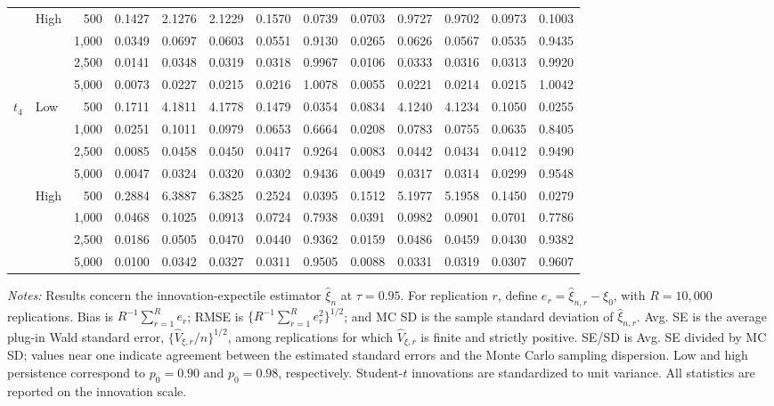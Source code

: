 \begin{table}[!p]
\begin{tabular}{llr*{10}{r}}
\addlinespace[1pt]
 & High & 500 & 0.1427 & 2.1276 & 2.1229 & 0.1570 & 0.0739 & 0.0703 & 0.9727 & 0.9702 & 0.0973 & 0.1003\\
 &  & 1,000 & 0.0349 & 0.0697 & 0.0603 & 0.0551 & 0.9130 & 0.0265 & 0.0626 & 0.0567 & 0.0535 & 0.9435\\
 &  & 2,500 & 0.0141 & 0.0348 & 0.0319 & 0.0318 & 0.9967 & 0.0106 & 0.0333 & 0.0316 & 0.0313 & 0.9920\\
 &  & 5,000 & 0.0073 & 0.0227 & 0.0215 & 0.0216 & 1.0078 & 0.0055 & 0.0221 & 0.0214 & 0.0215 & 1.0042\\
\addlinespace[3pt]
$t_4$ & Low & 500 & 0.1711 & 4.1811 & 4.1778 & 0.1479 & 0.0354 & 0.0834 & 4.1240 & 4.1234 & 0.1050 & 0.0255\\
 &  & 1,000 & 0.0251 & 0.1011 & 0.0979 & 0.0653 & 0.6664 & 0.0208 & 0.0783 & 0.0755 & 0.0635 & 0.8405\\
 &  & 2,500 & 0.0085 & 0.0458 & 0.0450 & 0.0417 & 0.9264 & 0.0083 & 0.0442 & 0.0434 & 0.0412 & 0.9490\\
 &  & 5,000 & 0.0047 & 0.0324 & 0.0320 & 0.0302 & 0.9436 & 0.0049 & 0.0317 & 0.0314 & 0.0299 & 0.9548\\
\addlinespace[1pt]
 & High & 500 & 0.2884 & 6.3887 & 6.3825 & 0.2524 & 0.0395 & 0.1512 & 5.1977 & 5.1958 & 0.1450 & 0.0279\\
 &  & 1,000 & 0.0468 & 0.1025 & 0.0913 & 0.0724 & 0.7938 & 0.0391 & 0.0982 & 0.0901 & 0.0701 & 0.7786\\
 &  & 2,500 & 0.0186 & 0.0505 & 0.0470 & 0.0440 & 0.9362 & 0.0159 & 0.0486 & 0.0459 & 0.0430 & 0.9382\\
 &  & 5,000 & 0.0100 & 0.0342 & 0.0327 & 0.0311 & 0.9505 & 0.0088 & 0.0331 & 0.0319 & 0.0307 & 0.9607\\
\bottomrule
\end{tabular}
\begin{minipage}{0.98\textwidth}\footnotesize\vspace{4pt}
\textit{Notes:} Results concern the innovation-expectile estimator $\widehat\xi_n$ at $\tau=0.95$. For replication $r$, define $e_r=\widehat\xi_{n,r}-\xi_0$, with $R=10{,}000$ replications. Bias is $R^{-1}\sum_{r=1}^R e_r$; RMSE is $\{R^{-1}\sum_{r=1}^R e_r^2\}^{1/2}$; and MC SD is the sample standard deviation of $\widehat\xi_{n,r}$. Avg. SE is the average plug-in Wald standard error, $\{\widehat V_{\xi,r}/n\}^{1/2}$, among replications for which $\widehat V_{\xi,r}$ is finite and strictly positive. SE/SD is Avg. SE divided by MC SD; values near one indicate agreement between the estimated standard errors and the Monte Carlo sampling dispersion. Low and high persistence correspond to $p_0=0.90$ and $p_0=0.98$, respectively. Student-$t$ innovations are standardized to unit variance. All statistics are reported on the innovation scale.
\end{minipage}
\end{table}
